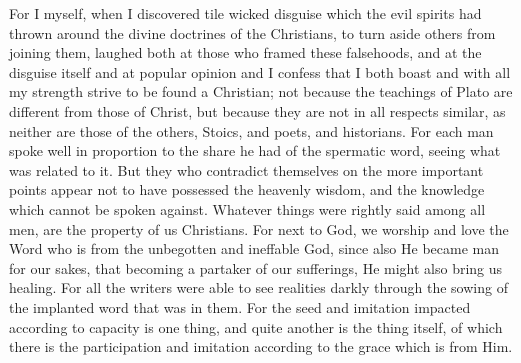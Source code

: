 \documentclass[9pt, twocolumn, oneside, a4paper]{memoir}
\begin{document}
For I myself, when I discovered tile wicked disguise which the evil spirits had thrown around the divine doctrines of the Christians, to turn aside others from joining them, laughed both at those who framed these falsehoods, and at the disguise itself and at popular opinion and I confess that I both boast and with all my strength  strive to be found a Christian; not because the teachings of Plato are different from those of Christ, but because they are not in all respects similar, as neither are those of the others, Stoics, and poets, and historians. For each man spoke well in proportion to the share he had of the spermatic word,  seeing what was related to it. But they who contradict themselves on the more important points appear not to have possessed the heavenly  wisdom, and the knowledge which cannot be spoken against. Whatever things were rightly said among all men, are the property of us Christians. For next to God, we worship and love the Word who is from the unbegotten and ineffable God, since also He became man for our sakes, that becoming a partaker of our sufferings, He might also bring us healing. For all the writers were able to see realities darkly through the sowing of the implanted word that was in them. For the seed and imitation impacted according to capacity is one thing, and quite another is the thing itself, of which there is the participation and imitation according to the grace which is from Him.
\end{document}
